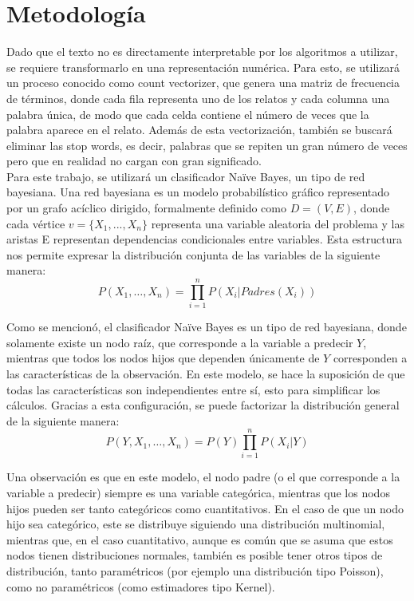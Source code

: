 \documentclass[12pt, letterpaper]{report}
\begin{document}
\section*{Metodología}

Dado que el texto no es directamente interpretable por los algoritmos a utilizar, se requiere transformarlo en una representación numérica. Para esto, se utilizará un proceso conocido como count vectorizer, que genera una matriz de frecuencia de términos, donde cada fila representa uno de los relatos y cada columna una palabra única, de modo que cada celda contiene el número de veces que la palabra aparece en el relato. Además de esta vectorización, también se buscará eliminar las stop words, es decir, palabras que se repiten un gran número de veces pero que en realidad no cargan con gran significado.
\\

Para este trabajo, se utilizará un clasificador Naïve Bayes, un tipo de red bayesiana. Una red bayesiana es un modelo probabilístico gráfico representado por un grafo acíclico dirigido, formalmente definido como $D=(V, E)$, donde cada vértice $v=\{ X_1, ..., X_n\}$ representa una variable aleatoria del problema y las aristas E representan dependencias condicionales entre variables. Esta estructura nos permite expresar la distribución conjunta de las variables de la siguiente manera:
\begin{equation*}
    P(X_1,\ldots ,X_n)=\prod_{i=1}^n P(X_i|Padres(X_i))
\end{equation*}

Como se mencionó, el clasificador Naïve Bayes es un tipo de red bayesiana, donde solamente existe un nodo raíz, que corresponde a la variable a predecir $Y$, mientras que todos los nodos hijos que dependen únicamente de $Y$ corresponden a las características de la observación. En este modelo, se hace la suposición de que todas las características son independientes entre sí, esto para simplificar los cálculos. Gracias a esta configuración, se puede factorizar la distribución general de la siguiente manera:
\begin{equation*}
    P(Y,X_1,\ldots ,X_n)=P(Y)\prod_{i=1}^n P(X_i|Y)
\end{equation*}

Una observación es que en este modelo, el nodo padre (o el que corresponde a la variable a predecir) siempre es una variable categórica, mientras que los nodos hijos pueden ser tanto categóricos como cuantitativos. En el caso de que un nodo hijo sea categórico, este se distribuye siguiendo una distribución multinomial, mientras que, en el caso cuantitativo, aunque es común que se asuma que estos nodos tienen distribuciones normales, también es posible tener otros tipos de distribución, tanto paramétricos (por ejemplo una distribución tipo Poisson), como no paramétricos (como estimadores tipo Kernel).
\\
\end{document}
